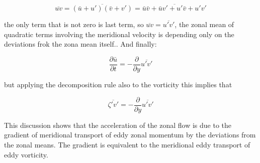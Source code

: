 \[\overline{u v} = \overline{(\bar{u}+u')(\bar{v}+v')} = \overline{\bar{u}\bar{v}+ \bar{u}v' + u'\bar{v}+ u'v'}\]

the only term that is not zero is last term, so
\(\overline{uv}=\overline{u'v'}\), the zonal mean of quadratic terms
involving the meridional velocity is depending only on the deviations
frok the zona mean itself.. And finally:

\[\frac{\partial \bar{u}}{\partial t} = -\frac{\partial }{\partial y}\overline{u'v'}\]

but applying the decomposition rule also to the vorticity this implies
that

\[\overline{\zeta'v'}=-\frac{\partial }{\partial y}\overline{u'v'}\]

This discussion shows that the acceleration of the zonal flow is due to
the gradient of meridional transport of eddy zonal momentum by the
deviations from the zonal means. The gradient is equivalent to the
meridional eddy transport of eddy vorticity.

